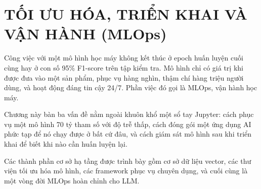 
\chapter{TỐI ƯU HÓA, TRIỂN KHAI VÀ VẬN HÀNH (MLOps)}
\label{chap:mlops}

Công việc với một mô hình học máy không kết thúc ở epoch huấn luyện cuối cùng hay ở con số 95\% F1-score trên tập kiểm tra. Mô hình chỉ có giá trị khi được đưa vào một sản phẩm, phục vụ hàng nghìn, thậm chí hàng triệu người dùng, và hoạt động đáng tin cậy 24/7. Phần việc đó gọi là MLOps, vận hành học máy.

Chương này bàn ba vấn đề nằm ngoài khuôn khổ một sổ tay Jupyter: cách phục vụ một mô hình 70 tỷ tham số với độ trễ thấp, cách đóng gói một ứng dụng AI phức tạp để nó chạy được ở bất cứ đâu, và cách giám sát mô hình sau khi triển khai để biết khi nào cần huấn luyện lại.

Các thành phần cơ sở hạ tầng được trình bày gồm cơ sở dữ liệu vector, các thư viện tối ưu hóa mô hình, các framework phục vụ chuyên dụng, và cuối cùng là một vòng đời MLOps hoàn chỉnh cho LLM.